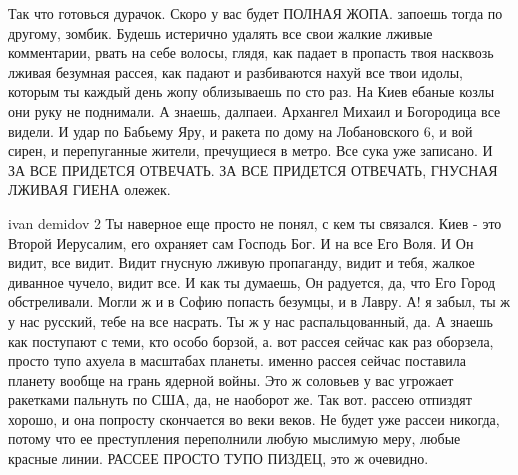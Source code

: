Так что готовься дурачок. Скоро у вас будет ПОЛНАЯ ЖОПА. запоешь тогда по
другому, зомбик. Будешь истерично удалять все свои жалкие лживые комментарии,
рвать на себе волосы, глядя, как падает в пропасть твоя насквозь лживая
безумная рассея, как падают и разбиваются нахуй все твои идолы, которым ты
каждый день жопу облизываешь по сто раз. На Киев ебаные козлы они руку не
поднимали. А знаешь, далпаеи. Архангел Михаил и Богородица все видели. И удар
по Бабьему Яру, и ракета по дому на Лобановского 6, и вой сирен, и перепуганные
жители, пречущиеся в метро. Все сука уже записано. И ЗА ВСЕ ПРИДЕТСЯ ОТВЕЧАТЬ.
ЗА ВСЕ ПРИДЕТСЯ ОТВЕЧАТЬ, ГНУСНАЯ ЛЖИВАЯ ГИЕНА олежек.

ivan demidov 2 Ты наверное еще просто не понял, с кем ты связался. Киев - это
Второй Иерусалим, его охраняет сам Господь Бог. И на все Его Воля. И Он видит,
все видит. Видит гнусную лживую пропаганду, видит и тебя, жалкое диванное
чучело, видит все. И как ты думаешь, Он радуется, да, что Его Город
обстреливали. Могли ж и в Софию попасть безумцы, и в Лавру. А! я забыл, ты ж у
нас русский, тебе на все насрать. Ты ж у нас распальцованный, да. А знаешь как
поступают с теми, кто особо борзой, а. вот рассея сейчас как раз оборзела,
просто тупо ахуела в масштабах планеты. именно рассея сейчас поставила планету
вообще на грань ядерной войны. Это ж соловьев у вас угрожает ракетками пальнуть
по США, да, не наоборот же. Так вот. рассею отпиздят хорошо, и она попросту
скончается во веки веков. Не будет уже рассеи никогда, потому что ее
преступления переполнили любую мыслимую меру, любые красные линии. РАССЕЕ
ПРОСТО ТУПО ПИЗДЕЦ, это ж очевидно.
